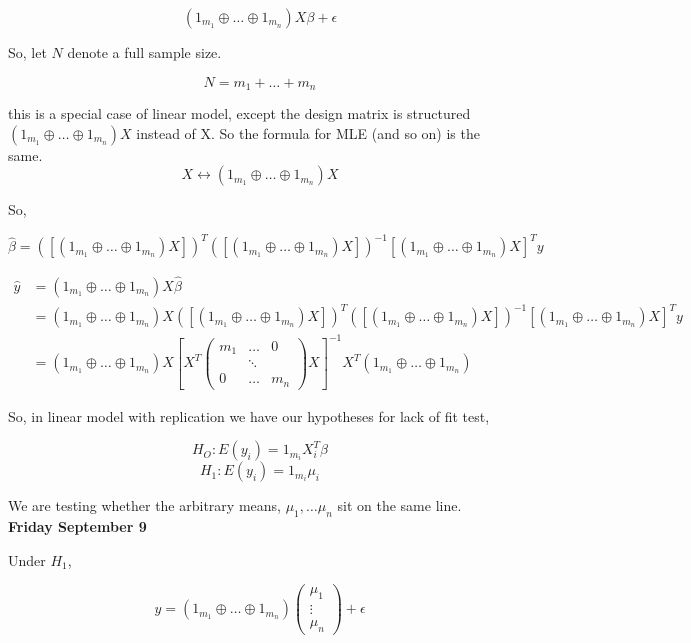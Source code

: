 \documentclass[11pt,fleqn]{book} %
\begin{document}

$$(1_{m_1} \oplus \dots \oplus 1_{m_n}) X\beta + \epsilon $$

So, let $N$ denote a full sample size. 

$$N = m_1 + \dots + m_n$$

this is a special case of linear model, except the design matrix is structured $(1_{m_1} \oplus \dots \oplus 1_{m_n})X $ instead of X. So the formula for MLE (and so on) is the same. \\

$$X \leftrightarrow (1_{m_1} \oplus \dots \oplus 1_{m_n})X$$

So, 

$$\hat{\beta} = ([(1_{m_1} \oplus \dots \oplus 1_{m_n})X])^T ([(1_{m_1} \oplus \dots \oplus 1_{m_n})X])^{-1} [(1_{m_1} \oplus \dots \oplus 1_{m_n})X]^T y$$

\begin{align*}
\hat{y} &= (1_{m_1} \oplus \dots \oplus 1_{m_n})X \hat{\beta} \\
	&= (1_{m_1} \oplus \dots \oplus 1_{m_n})X ([(1_{m_1} \oplus \dots \oplus 1_{m_n})X])^T ([(1_{m_1} \oplus \dots \oplus 1_{m_n})X])^{-1} [(1_{m_1} \oplus \dots \oplus 1_{m_n})X]^T y\\
	&=  (1_{m_1} \oplus \dots \oplus 1_{m_n})X [X^T \begin{pmatrix}
		m_1 & \dots & 0\\
		  & \ddots  & \\
		  0 & \dots & m_n
	\end{pmatrix} 	X]^{-1} X^T (1_{m_1} \oplus \dots \oplus 1_{m_n})	
\end{align*}

So, in linear model with replication we have our hypotheses for lack of fit test, 

$$H_O: E(y_i) = 1_{m_i} X_i^T \beta$$
$$H_1: E(y_i) = 1_{m_i} \mu_i $$


We are testing whether the arbitrary means, $\mu_1, \dots \mu_n$ sit on the same line. \\


\textbf{Friday September 9}

Under $H_1$, 

$$ y = (1_{m_1} \oplus \dots \oplus 1_{m_n}) \begin{pmatrix}
	\mu_1\\
	\vdots\\
	\mu_n
\end{pmatrix}
+ \epsilon$$
\end{document}

